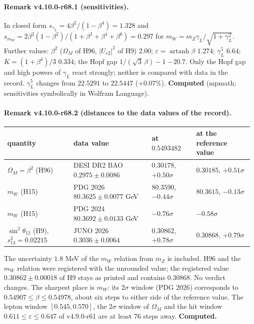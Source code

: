 \paragraph{Remark v4.10.0-r68.1 (sensitivities).}
In closed form \(s_{\gamma_L}=4\beta^2/(1-\beta^4)=1.328\) and \(s_{m_W}=2\beta^2(1-\beta^2)/(1+\beta^2+\beta^4+\beta^6)=0.297\) for
\(m_W=m_Z\gamma_L/\sqrt{1+\gamma_L^2}\).  Further values: \(\beta^2\) (\(\Omega_M\) of H96, \(|U_{e2}|^2\) of H9) \(2.00\);
\(\varepsilon=\operatorname{artanh}\beta\) \(1.274\); \(\gamma_L^5\) \(6.64\); \(K=(1+\beta^4)/3\) \(0.334\); the Hopf gap
\(1/(\sqrt3\,\beta)-1\) \(-20.7\).  Only the Hopf gap and high powers of \(\gamma_L\) react strongly; neither is compared with data in the
record.  \(\gamma_L^5\) changes from \(22.5291\) to \(22.5447\) (\(+0.07\%\)).  \textbf{Computed} (mpmath; sensitivities symbolically in
Wolfram Language).

\paragraph{Remark v4.10.0-r68.2 (distances to the data values of the record).}
\begin{center}
\small
\begin{tabular}{@{}>{\raggedright\arraybackslash}p{}>{\raggedright\arraybackslash}p{}>{\raggedright\arraybackslash}p{}>{\raggedright\arraybackslash}p{}@{}}
\toprule
quantity & data value & at \(0.5493482\) & at the reference value\\
\midrule
\(\Omega_M=\beta^2\) (H96) & DESI DR2 BAO \(0.2975\pm0.0086\) & \(0.30178\), \(+0.50\sigma\) & \(0.30185\), \(+0.51\sigma\)\\
\(m_W\) (H15) & PDG 2026 \(80.3625\pm0.0077\) GeV & \(80.3590\), \(-0.44\sigma\) & \(80.3615\), \(-0.13\sigma\)\\
\(m_W\) (H15) & PDG 2024 \(80.3692\pm0.0133\) GeV & \(-0.76\sigma\) & \(-0.58\sigma\)\\
\(\sin^2\theta_{12}\) (H9), \(s_{13}^2=0.02215\) & JUNO 2026 \(0.3036\pm0.0064\) & \(0.30862\), \(+0.78\sigma\) & \(0.30868\), \(+0.79\sigma\)\\
\bottomrule
\end{tabular}
\end{center}
The uncertainty \(1.8\) MeV of the \(m_W\) relation from \(m_Z\) is included.  H96 and the \(m_W\) relation were registered with the unrounded
value; the registered value \(0.30862\pm0.00018\) of H9 stays as printed and contains \(0.30868\).  No verdict changes.  The sharpest place is
\(m_W\): its \(2\sigma\) window (PDG 2026) corresponds to \(0.54907\le\beta\le0.54978\), about six steps to either side of the reference value.
The lepton window \([0.545,0.570]\), the \(2\sigma\) window of \(\Omega_M\) and the hit window \(0.611\le\varepsilon\le0.647\) of v4.9.0-r61
are at least \(76\) steps away.  \textbf{Computed.}

